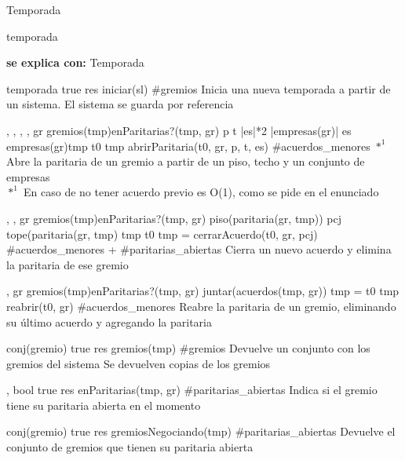 \begin{interfaz}{Temporada}

\begin{iparamformales}{temporada}

\textbf{\large se explica con:} Temporada

\end{iparamformales}

{}{temporada}
{true}
{res \igobs iniciar(sl)}
{\#gremios}
{Inicia una nueva temporada a partir de un sistema.}
{El sistema se guarda por referencia}

{, , , , }{}
{gr \in gremios(tmp)\ly \neg enParitarias?(tmp, gr) \ly p \leq t \ly |es|*2 \leq |empresas(gr)| \ly es \subseteq empresas(gr)\ly tmp \igobs t0 }
{tmp \igobs abrirParitaria(t0, gr, p, t, es)  }
{\#acuerdos\_menores $*^1$}
{Abre la paritaria de un gremio a partir de un piso, techo y un conjunto de empresas \\
$*^1$ En caso de no tener acuerdo previo es O(1), como se pide en el enunciado}
{}

{,  ,  }{}
{ gr \in gremios(tmp)\lyl enParitarias?(tmp, gr) \ly piso(paritaria(gr, tmp)) \leq pcj \leq tope(paritaria(gr, tmp) \ly tmp \igobs t0 }
{tmp = cerrarAcuerdo(t0, gr, pcj)}
{\#acuerdos\_menores + \#paritarias\_abiertas}
{Cierra un nuevo acuerdo y elimina la paritaria de ese gremio}
{}

{, }{}
{gr \in gremios(tmp)\ly \neg enParitarias?(tmp, gr) \ly \emptyset \neq  juntar(acuerdos(tmp, gr)) \ly tmp = t0 }
{tmp \igobs reabrir(t0, gr) }
{\#acuerdos\_menores}
{Reabre la paritaria de un gremio, eliminando su \'ultimo acuerdo y agregando la paritaria}
{}

{}{conj(gremio)}
{true}
{res \igobs gremios(tmp) }
{\#gremios }
{Devuelve un conjunto con los gremios del sistema}
{Se devuelven copias de los gremios}

{, }{bool}
{true}
{ res \igobs enParitarias(tmp, gr) }
{\#paritarias\_abiertas}
{Indica si el gremio tiene su paritaria abierta en el momento}
{}

{}{conj(gremio)}
{true}
{res \igobs gremiosNegociando(tmp)}
{\#paritarias\_abiertas}
{Devuelve el conjunto de gremios que tienen su paritaria abierta }
{}


\end{interfaz}

